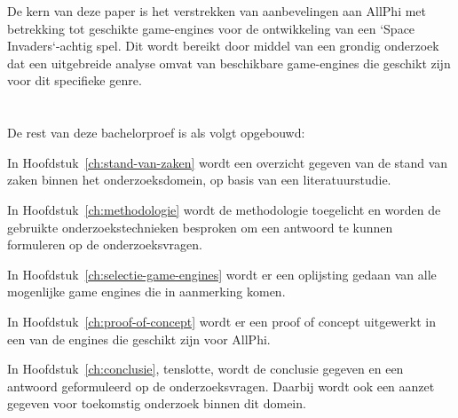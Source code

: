 De kern van deze paper is het verstrekken van aanbevelingen aan AllPhi met betrekking tot geschikte game-engines voor de ontwikkeling van een `Space Invaders`-achtig spel. Dit wordt bereikt door middel van een grondig onderzoek dat een uitgebreide analyse omvat van beschikbare game-engines die geschikt zijn voor dit specifieke genre.

\section{}%
\label{sec:opzet-bachelorproef}


De rest van deze bachelorproef is als volgt opgebouwd:

In Hoofdstuk~\ref{ch:stand-van-zaken} wordt een overzicht gegeven van de stand van zaken binnen het onderzoeksdomein, op basis van een literatuurstudie.

In Hoofdstuk~\ref{ch:methodologie} wordt de methodologie toegelicht en worden de gebruikte onderzoekstechnieken besproken om een antwoord te kunnen formuleren op de onderzoeksvragen.

In Hoofdstuk~\ref{ch:selectie-game-engines} wordt er een oplijsting gedaan van alle mogenlijke game engines die in aanmerking komen.



In Hoofdstuk~\ref{ch:proof-of-concept} wordt er een proof of concept uitgewerkt in een van de engines die geschikt zijn voor AllPhi.

In Hoofdstuk~\ref{ch:conclusie}, tenslotte, wordt de conclusie gegeven en een antwoord geformuleerd op de onderzoeksvragen. Daarbij wordt ook een aanzet gegeven voor toekomstig onderzoek binnen dit domein.